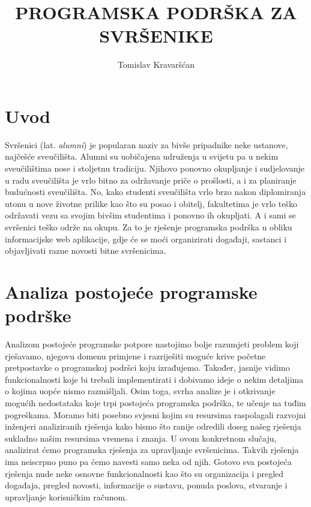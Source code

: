 \documentclass[zavrsni, numeric]{fer}
\begin{document}

\title{PROGRAMSKA PODRŠKA ZA SVRŠENIKE} 

\author{Tomislav Kravaršćan}

\maketitle
 
\tableofcontents

\chapter{Uvod}
Svršenici (lat. \textit{alumni}) je popularan naziv za bivše pripadnike neke ustanove, najčešće sveučilišta. Alumni su uobičajena udruženja u svijetu pa u nekim sveučilištima nose i stoljetnu tradiciju. Njihovo ponovno okupljanje i sudjelovanje u radu sveučilišta je vrlo bitno za održavanje priče o prošlosti, a i za planiranje budućnosti sveučilišta. No, kako studenti sveučilišta vrlo brzo nakon diplomiranja utonu u nove životne prilike kao što su posao i obitelj, fakultetima je vrlo teško održavati vezu sa svojim bivšim studentima i ponovno ih okupljati. A i sami se svršenici teško održe na okupu. Za to je rješenje programska podrška u obliku informacijske web aplikacije, gdje će se moći organizirati događaji, sastanci i objavljivati razne novosti bitne svršenicima.

\chapter{Analiza postojeće programske podrške}
Analizom postojeće programske potpore nastojimo bolje razumjeti problem koji rješavamo, njegovu domenu primjene i razriješiti moguće krive početne pretpostavke o programskoj podršci koju izrađujemo. Također, jasnije vidimo funkcionalnosti koje bi trebali implementirati i dobivamo ideje o nekim detaljima o kojima uopće nismo razmišljali. Osim toga, svrha analize je i otkrivanje mogućih nedostataka koje trpi postojeća programska podrška, te učenje na tuđim pogreškama. Moramo biti posebno svjesni kojim su resursima raspolagali razvojni inženjeri analiziranih rješenja kako bismo što ranije odredili doseg našeg rješenja sukladno našim resursima vremena i znanja.
U ovom konkretnom slučaju, analizirat ćemo programska rješenja za upravljanje svršenicima. Takvih rješenja ima neiscrpno puno pa ćemo navesti samo neka od njih. Gotovo sva postojeća rješenja nude neke osnovne funkcionalnosti kao što su organizacija i pregled događaja, pregled novosti, informacije o sustavu, ponuda poslova, stvaranje i upravljanje korisničkim računom.
\end{document}
